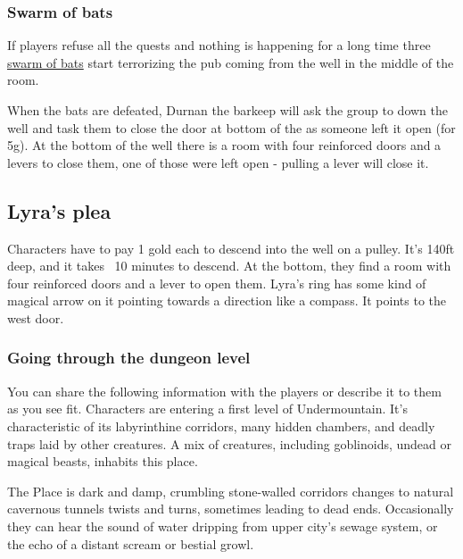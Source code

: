 \documentclass[10pt,onecolumn,twoside,openany,bg=full,layout=true]{dndbook}
\begin{document}
\subsubsection{Swarm of bats}
If players refuse all the quests and nothing is happening for a long time three
\href{https://www.dndbeyond.com/monsters/17028-swarm-of-bats}{swarm of bats} start terrorizing the pub coming from the well in the middle of the room.

When the bats are defeated, Durnan the barkeep will ask the group to down the well and task them to close the door at bottom of the as someone left it open (for 5g).
At the bottom of the well there is a room with four reinforced doors and a levers to close them, one of those were left open - pulling a lever will close it.
\vfill
\newpage

\subsection{Lyra's plea}\label{subsec:lyras-plea}
Characters have to pay 1 gold each to descend into the well on a pulley.
It's 140ft deep, and it takes ~10 minutes to descend.
At the bottom, they find a room with four reinforced doors and a lever to open them.
Lyra's ring has some kind of magical arrow on it pointing towards a direction like a compass.
It points to the west door.
\subsubsection{Going through the dungeon level}
You can share the following information with the players or describe it to them as you see fit.
Characters are entering a first level of Undermountain.
It's characteristic of its labyrinthine corridors, many hidden chambers, and deadly traps laid by other creatures.
A mix of creatures, including goblinoids, undead or magical beasts, inhabits this place.
\begin{DndReadAloud}
The Place is dark and damp, crumbling stone-walled corridors changes to natural cavernous tunnels twists and turns, sometimes leading to dead ends.
Occasionally they can hear the sound of water dripping from upper city's sewage system, or the echo of a distant scream or bestial growl.
\end{DndReadAloud}
\end{document}
